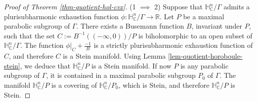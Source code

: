 \documentclass{article}
\theoremstyle{definition}
\theoremstyle{remark}
\newcommand{\C}{\mathbb{C}}
\newcommand{\R}{\mathbb{R}}
\newcommand{\HNC}{\mathbb{H}^{n}_{\C}}
\begin{document}
	\begin{proof}[Proof of Theorem \ref{thm-quotient-hol-cvx}]
		(1 $\implies$ 2) Suppose that $\HNC/\Gamma$ admits a plurisubharmonic exhaustion function $\phi:\HNC/\Gamma\to \R$. Let $P$ be a maximal parabolic subgroup of $\Gamma$. There exists a Busemann function $B$, invariant under $P$, such that the set $C:=B^{-1}((-\infty,0))/P$ is biholomorphic to an open subset of $\HNC/\Gamma$. The function $\phi\vert_{ C} + \frac{-1}{B}$ is a strictly plurisubharmonic exhaustion function of $C$, and therefore $C$ is a Stein manifold. Using Lemma \ref{lem-quotient-horoboule-stein}, we deduce that $\HNC/P$ is a Stein manifold. If now $P$ is any parabolic subgroup of $\Gamma$, it is contained in a maximal parabolic subgroup $P_0$ of $\Gamma$. The manifold $\HNC/P$ is a covering of $\HNC/P_0$, which is Stein, and therefore $\HNC/P$ is Stein.
		

\end{proof}
\end{document}
